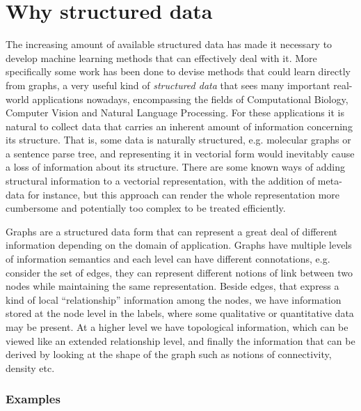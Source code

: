 \section{Why structured data}
\label{sec:why}

The increasing amount of available structured data has made it necessary to develop
machine learning methods that can effectively deal with it.
More specifically some work has been done to devise methods that could learn
directly from graphs, a very useful kind of \emph{structured data} that sees many
important real-world applications nowadays, encompassing the fields of Computational
Biology, Computer Vision and Natural Language Processing.
For these applications it is natural to collect data that carries an inherent
amount of information concerning its structure.
That is, some data is naturally structured, e.g. molecular graphs or a sentence parse tree,
and representing it in vectorial form would inevitably cause a loss of information about
its structure.
There are some known ways of adding structural information to a vectorial representation,
with the addition of meta-data for instance, but this approach can render the
whole representation more cumbersome and potentially too complex to be treated
efficiently.

Graphs are a structured data form that can represent a great deal of different
information depending on the domain of application.
Graphs have multiple levels of information semantics and each level can have
different connotations, e.g. consider the set of edges, they can represent
different notions of link between two nodes while maintaining the same
representation.
Beside edges, that express a kind of local ``relationship''
information among the nodes, we have information stored at the node level in the
labels, where some qualitative or quantitative data may be present.
At a higher level we have topological information, which can be
viewed like an extended relationship level, and finally the information that can
be derived by looking at the shape of the graph such as notions
of connectivity, density etc.

\subsubsection{Examples}
\label{subsubsec:examples}

